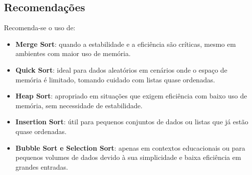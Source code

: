 \documentclass[tcc1,project]{uftex}
\begin{document}
\subsection{Recomendações}
Recomenda-se o uso de:
\begin{itemize}
    \item \textbf{Merge Sort}: quando a estabilidade e a eficiência são críticas, mesmo em ambientes com maior uso de memória.
    \item \textbf{Quick Sort}: ideal para dados aleatórios em cenários onde o espaço de memória é limitado, tomando cuidado com listas quase ordenadas.
    \item \textbf{Heap Sort}: apropriado em situações que exigem eficiência com baixo uso de memória, sem necessidade de estabilidade.
    \item \textbf{Insertion Sort}: útil para pequenos conjuntos de dados ou listas que já estão quase ordenadas.
    \item \textbf{Bubble Sort e Selection Sort}: apenas em contextos educacionais ou para pequenos volumes de dados devido à sua simplicidade e baixa eficiência em grandes entradas.
\end{itemize}


\end{document}
